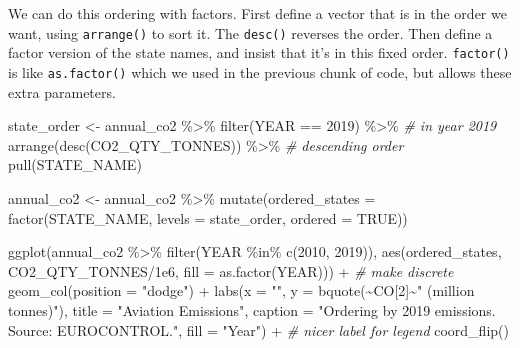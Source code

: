 \documentclass[
]{book}
\newenvironment{Shaded}{\begin{snugshade}}{\end{snugshade}}
\newcommand{\AttributeTok}[1]{\textcolor[rgb]{0.77,0.63,0.00}{#1}}
\newcommand{\CommentTok}[1]{\textcolor[rgb]{0.56,0.35,0.01}{\textit{#1}}}
\newcommand{\ConstantTok}[1]{\textcolor[rgb]{0.00,0.00,0.00}{#1}}
\newcommand{\DecValTok}[1]{\textcolor[rgb]{0.00,0.00,0.81}{#1}}
\newcommand{\FloatTok}[1]{\textcolor[rgb]{0.00,0.00,0.81}{#1}}
\newcommand{\FunctionTok}[1]{\textcolor[rgb]{0.00,0.00,0.00}{#1}}
\newcommand{\NormalTok}[1]{#1}
\newcommand{\OtherTok}[1]{\textcolor[rgb]{0.56,0.35,0.01}{#1}}
\newcommand{\SpecialCharTok}[1]{\textcolor[rgb]{0.00,0.00,0.00}{#1}}
\newcommand{\StringTok}[1]{\textcolor[rgb]{0.31,0.60,0.02}{#1}}
\begin{document}
We can do this ordering with factors. First define a vector that is in the order we want, using \texttt{arrange()} to sort it. The \texttt{desc()} reverses the order. Then define a factor version of the state names, and insist that it's in this fixed order. \texttt{factor()} is like \texttt{as.factor()} which we used in the previous chunk of code, but allows these extra parameters.

\begin{Shaded}
\begin{Highlighting}[]
\NormalTok{state\_order }\OtherTok{\textless{}{-}}\NormalTok{ annual\_co2 }\SpecialCharTok{\%\textgreater{}\%} 
  \FunctionTok{filter}\NormalTok{(YEAR }\SpecialCharTok{==} \DecValTok{2019}\NormalTok{) }\SpecialCharTok{\%\textgreater{}\%}     \CommentTok{\# in year 2019}
  \FunctionTok{arrange}\NormalTok{(}\FunctionTok{desc}\NormalTok{(CO2\_QTY\_TONNES)) }\SpecialCharTok{\%\textgreater{}\%}  \CommentTok{\# descending order}
  \FunctionTok{pull}\NormalTok{(STATE\_NAME) }

\NormalTok{annual\_co2 }\OtherTok{\textless{}{-}}\NormalTok{ annual\_co2 }\SpecialCharTok{\%\textgreater{}\%} 
  \FunctionTok{mutate}\NormalTok{(}\AttributeTok{ordered\_states =} \FunctionTok{factor}\NormalTok{(STATE\_NAME, }
                                 \AttributeTok{levels =}\NormalTok{ state\_order, }\AttributeTok{ordered =} \ConstantTok{TRUE}\NormalTok{))}

\FunctionTok{ggplot}\NormalTok{(annual\_co2 }\SpecialCharTok{\%\textgreater{}\%} 
         \FunctionTok{filter}\NormalTok{(YEAR }\SpecialCharTok{\%in\%} \FunctionTok{c}\NormalTok{(}\DecValTok{2010}\NormalTok{, }\DecValTok{2019}\NormalTok{)), }
       \FunctionTok{aes}\NormalTok{(ordered\_states,}
\NormalTok{           CO2\_QTY\_TONNES}\SpecialCharTok{/}\FloatTok{1e6}\NormalTok{,}
           \AttributeTok{fill =} \FunctionTok{as.factor}\NormalTok{(YEAR))) }\SpecialCharTok{+}  \CommentTok{\# make discrete}
  \FunctionTok{geom\_col}\NormalTok{(}\AttributeTok{position =} \StringTok{"dodge"}\NormalTok{) }\SpecialCharTok{+}
  \FunctionTok{labs}\NormalTok{(}\AttributeTok{x =} \StringTok{""}\NormalTok{, }
       \AttributeTok{y =} \FunctionTok{bquote}\NormalTok{(}\SpecialCharTok{\textasciitilde{}}\NormalTok{CO[}\DecValTok{2}\NormalTok{]}\SpecialCharTok{\textasciitilde{}}\StringTok{" (million tonnes)"}\NormalTok{),}
       \AttributeTok{title =} \StringTok{"Aviation Emissions"}\NormalTok{,}
       \AttributeTok{caption =} \StringTok{"Ordering by 2019 emissions. Source: EUROCONTROL."}\NormalTok{,}
       \AttributeTok{fill =} \StringTok{"Year"}\NormalTok{) }\SpecialCharTok{+} \CommentTok{\# nicer label for legend}
  \FunctionTok{coord\_flip}\NormalTok{()}
\end{Highlighting}
\end{Shaded}
\end{document}
